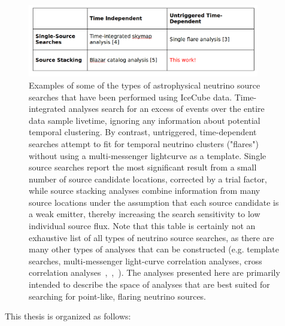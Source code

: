 \begin{figure}[h]
\centering
\includegraphics[width=0.9\textwidth]{figs/ana_table.png}
\caption{Examples of some of the types of astrophysical neutrino source searches that have been performed using IceCube data. Time-integrated analyses search for an excess of events over the entire data sample livetime, ignoring any information about potential temporal clustering. By contrast, untriggered, time-dependent searches attempt to fit for temporal neutrino clusters ("flares") without using a multi-messenger lightcurve as a template. Single source searches report the most significant result from a small number of source candidate locations, corrected by a trial factor, while source stacking analyses combine information from many source locations under the assumption that each source candidate is a weak emitter, thereby increasing the search sensitivity to low individual source flux. Note that this table is certainly not an exhaustive list of all types of neutrino source searches, as there are many other types of analyses that can be constructed (e.g. template searches, multi-messenger light-curve correlation analyses, cross correlation analyses~\cite{IC_HAWC_GP},~\cite{Fang_2020},~\cite{liu2021searching}). The analyses presented here are primarily intended to describe the space of analyses that are best suited for searching for point-like, flaring neutrino sources.}
\label{tab:anatable}
\end{figure}

This thesis is organized as follows:

